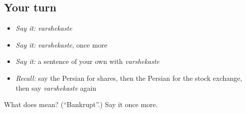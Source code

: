 \subsection*{Your turn}
\begin{itemize}
\raggedright
  \item \emph{Say it:} \emph{varshekaste}
  \item \emph{Say it:} \emph{varshekaste}, once more
  \item \emph{Say it:} a sentence of your own with \emph{varshekaste}
  \item \emph{Recall:} say the Persian for shares, then the Persian for the stock exchange, then say \emph{varshekaste} again
\end{itemize}

\begin{tcolorbox}[breakable,colback=teal!4,colframe=teal!35!black,title={Before you move on}]
What does  mean? (\textquotedblleft{}Bankrupt\textquotedblright{}.) Say it once more.
\end{tcolorbox}
